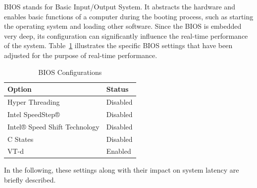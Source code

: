 \documentclass[MMR,Master,english]{twbook}
\begin{document}
BIOS stands for Basic Input/Output System. It abstracts the hardware and enables basic functions of a computer during the booting process, such as starting the operating system and loading other software. Since the BIOS is embedded very deep, its configuration can significantly influence the real-time performance of the system. Table~\ref{tab:bios_configuration} illustrates the specific BIOS settings that have been adjusted for the purpose of real-time performance. 

\begin{table}[H]
	\centering
	\caption{BIOS Configurations}
	\label{tab:bios_configuration}
	\setlength{\tabcolsep}{0.5em} %
	{\renewcommand{\arraystretch}{1.2}%
	\begin{tabular}{|l|l|}
	\hline
	\textbf{Option} & \textbf{Status} \\
	\hline
	Hyper Threading & Disabled \\
	\hline
	Intel SpeedStep® & Disabled \\
	\hline
	Intel® Speed Shift Technology & Disabled \\
	\hline
	C States & Disabled \\
	\hline
	VT-d & Enabled \\
	\hline
	\end{tabular}}
	\end{table}	
	
	\noindent In the following, these settings along with their impact on system latency are briefly described. 
\end{document}
